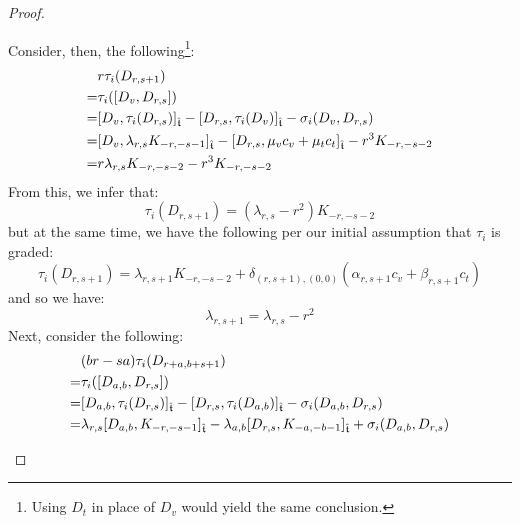 \begin{proof}
\begin{enumerate}
                    Consider, then, the following\footnote{Using $D_t$ in place of $D_v$ would yield the same conclusion.}:
                        $$
                            \begin{aligned}
                                & r \tau_i(D_{r, s + 1})
                                \\
                                = & \tau_i([D_v, D_{r, s}])
                                \\
                                = & [D_v, \tau_i(D_{r, s})]_{\hat{\mathfrak{t}}} - [D_{r, s}, \tau_i(D_v)]_{\hat{\mathfrak{t}}} - \sigma_i(D_v, D_{r, s})
                                \\
                                = & [D_v, \lambda_{r, s} K_{-r, -s - 1}]_{\hat{\mathfrak{t}}} - [D_{r, s}, \mu_v c_v + \mu_t c_t]_{\hat{\mathfrak{t}}} - r^3 K_{-r, -s - 2}
                                \\
                                = & r \lambda_{r, s} K_{-r, -s - 2} - r^3 K_{-r, -s - 2}
                            \end{aligned}
                        $$
                    From this, we infer that:
                        $$\tau_i(D_{r, s + 1}) = (\lambda_{r, s} - r^2) K_{-r, -s - 2}$$
                    but at the same time, we have the following per our initial assumption that $\tau_i$ is graded:
                        $$\tau_i(D_{r, s + 1}) = \lambda_{r, s + 1} K_{-r, -s - 2} + \delta_{(r, s + 1), (0, 0)} ( \alpha_{r, s + 1} c_v + \beta_{r, s + 1} c_t )$$
                    and so we have:
                        $$\lambda_{r, s + 1} = \lambda_{r, s} - r^2$$
                    Next, consider the following:
                        $$
                            \begin{aligned}
                                & (br - sa) \tau_i(D_{r + a, b + s + 1})
                                \\
                                = & \tau_i( [D_{a, b}, D_{r, s}] )
                                \\
                                = & [D_{a, b}, \tau_i(D_{r, s})]_{\hat{\mathfrak{t}}} - [D_{r, s}, \tau_i(D_{a, b})]_{\hat{\mathfrak{t}}} - \sigma_i(D_{a, b}, D_{r, s})
                                \\
                                = & \lambda_{r, s} [D_{a, b}, K_{-r, -s - 1}]_{\hat{\mathfrak{t}}} - \lambda_{a, b} [D_{r, s}, K_{-a, -b - 1}]_{\hat{\mathfrak{t}}} + \sigma_i(D_{a, b}, D_{r, s})
                            \end{aligned}
$$
\end{enumerate}
\end{proof}
